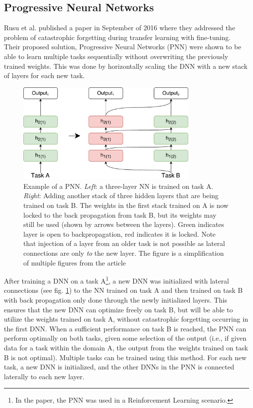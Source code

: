 \subsection{Progressive Neural Networks}
Rusu et al. published a paper in September of 2016\cite{progressiveneuralnetworks} where they addressed the problem of catastrophic forgetting during transfer learning with fine-tuning. Their proposed solution, Progressive Neural Networks (PNN) were shown to be able to learn multiple tasks sequentially without overwriting the previously trained weights. This was done by horizontally scaling the DNN with a new stack of layers for each new task.
\begin{figure}[h]
    \centering
    \includegraphics[width=0.8\textwidth]{Chapters/2.Background/figures/ProgressiveNeuralNet.pdf}
    \caption[Progressive Neural Network]{Example of a PNN. \textit{Left}: a three-layer NN is trained on task A. \textit{Right}: Adding another stack of three hidden layers that are being trained on task B. The weights in the first stack trained on A is now locked to the back propagation from task B, but its weights may still be used (shown by arrows between the layers). Green indicates layer is open to backpropagation, red indicates it is locked. Note that injection of a layer from an older task is not possible as lateral connections are only \textit{to} the new layer. The figure is a simplification of multiple figures from the article\cite{progressiveneuralnetworks}}
    \label{fig:pnn}
\end{figure}
After training a DNN on a task A\footnote{In the paper, the PNN was used in a Reinforcement Learning scenario.}, a new DNN was initialized with lateral connections (see fig. \ref{fig:pnn}) to the NN trained on task A and then trained on task B with back propagation only done through the newly initialized layers. This ensures that the new DNN can optimize freely on task B, but will be able to utilize the weights trained on task A, without catastrophic forgetting occurring in the first DNN. When a sufficient performance on task B is reached, the PNN can perform optimally on both tasks, given some selection of the output (i.e., if given data for a task within the domain A, the output from the weights trained on task B is not optimal). Multiple tasks can be trained using this method. For each new task, a new DNN is initialized, and the other DNNs in the PNN is connected laterally to each new layer. 

